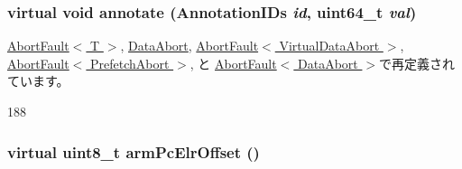 {\subsubsection[{annotate}]{\setlength{\rightskip}{0pt plus 5cm}virtual void annotate ({\bf AnnotationIDs} {\em id}, \/  uint64\_\-t {\em val})}}
\label{classArmISA_1_1ArmFault_a1711e0fd9d5fa3eaa8e62cc821ef850d}


\hyperlink{classArmISA_1_1AbortFault_a1534ab135f3f8a49ad6274389bf77b51}{AbortFault$<$ T $>$}, \hyperlink{classArmISA_1_1DataAbort_a284956f8d8ec0f18434d857ae44c6a6c}{DataAbort}, \hyperlink{classArmISA_1_1AbortFault_a1534ab135f3f8a49ad6274389bf77b51}{AbortFault$<$ VirtualDataAbort $>$}, \hyperlink{classArmISA_1_1AbortFault_a1534ab135f3f8a49ad6274389bf77b51}{AbortFault$<$ PrefetchAbort $>$}, と \hyperlink{classArmISA_1_1AbortFault_a1534ab135f3f8a49ad6274389bf77b51}{AbortFault$<$ DataAbort $>$}で再定義されています。


\begin{DoxyCode}
188 {}
\end{DoxyCode}
\hypertarget{classArmISA_1_1ArmFault_ac6225f20625dd9cd1d2ff5a5813ccb56}{
\subsubsection[{armPcElrOffset}]{\setlength{\rightskip}{0pt plus 5cm}virtual uint8\_\-t armPcElrOffset ()}}
\label{classArmISA_1_1ArmFault_ac6225f20625dd9cd1d2ff5a5813ccb56}


